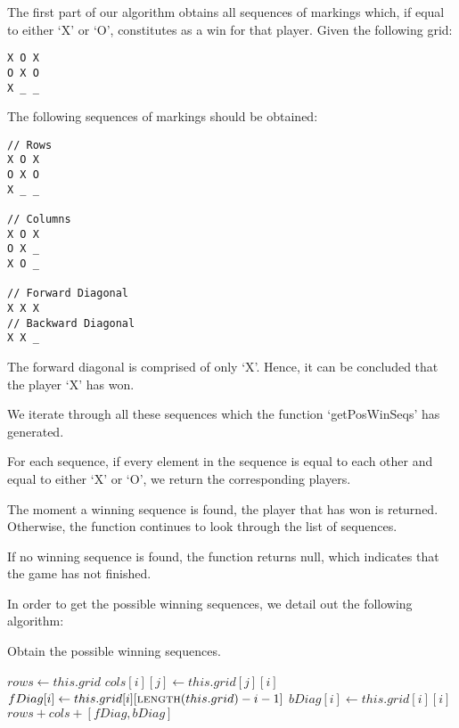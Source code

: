 \documentclass{article}
\begin{document}
The first part of our algorithm obtains all sequences of markings which, if equal to either `X' or `O', constitutes as a win for that player. Given the following grid:

\begin{verbatim}
X O X
O X O
X _ _
\end{verbatim}

The following sequences of markings should be obtained:

\begin{verbatim}
// Rows
X O X
O X O
X _ _

// Columns
X O X
O X _
X O _

// Forward Diagonal
X X X
// Backward Diagonal
X X _
\end{verbatim}

The forward diagonal is comprised of only `X'. Hence, it can be concluded that the player `X' has won.

We iterate through all these sequences which the function `getPosWinSeqs' has generated.

For each sequence, if every element in the sequence is equal to each other and equal to either `X' or `O', we return the corresponding players.

The moment a winning sequence is found, the player that has won is returned. Otherwise, the function continues to look through the list of sequences.

If no winning sequence is found, the function returns null, which indicates that the game has not finished.

In order to get the possible winning sequences, we detail out the following algorithm:

\begin{algorithm}
\caption{Obtain the possible winning sequences.}

\begin{algorithmic}[1]
  \State $rows \gets this.grid$
      \State $cols[i][j] \gets this.grid[j][i]$
    \EndFor
  \EndFor
    \State $fDiag[i] \gets this.grid[i][\Call{length}{this.grid} - i - 1]$
  \EndFor
    \State $bDiag[i] \gets this.grid[i][i]$
  \EndFor
  \Return $rows + cols + [fDiag, bDiag]$
\EndProcedure
\end{algorithmic}
\end{algorithm}
\end{document}

